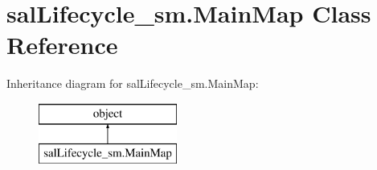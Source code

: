 \hypertarget{classsal_lifecycle__sm_1_1_main_map}{\section{sal\-Lifecycle\-\_\-sm.\-Main\-Map Class Reference}
\label{classsal_lifecycle__sm_1_1_main_map}
}
Inheritance diagram for sal\-Lifecycle\-\_\-sm.\-Main\-Map\-:\begin{figure}[H]
\begin{center}
\leavevmode
\includegraphics[height=2.000000cm]{classsal_lifecycle__sm_1_1_main_map}
\end{center}
\end{figure}
